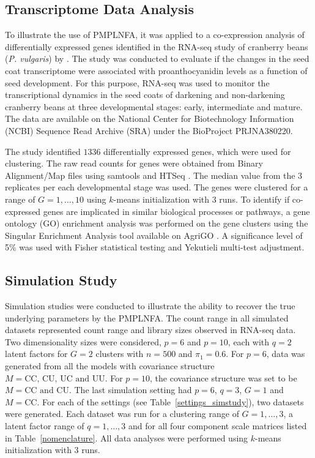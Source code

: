 \documentclass[12pt]{article}
\begin{document}
\subsection{Transcriptome Data Analysis} 
To illustrate the use of PMPLNFA, it was applied to a co-expression analysis of differentially expressed genes identified in the RNA-seq study of cranberry beans (\textit{P. vulgaris}) by \citet{freixascoutin2017}. The study was conducted to evaluate if the changes in the seed coat transcriptome were associated with proanthocyanidin levels as a function of seed development. For this purpose, RNA-seq was used to monitor the transcriptional dynamics in the seed coats of darkening and non-darkening cranberry beans at three developmental stages: early, intermediate and mature. The data are available on the National Center for Biotechnology Information (NCBI) Sequence Read Archive (SRA) under the BioProject PRJNA380220.

The study identified $1336$ differentially expressed genes, which were used for clustering. The raw read counts for genes were obtained from Binary Alignment/Map files using samtools \citep{li2009} and HTSeq \citep{anders2015}. The median value from the $3$ replicates per each developmental stage was used. The genes were clustered for a range of $G = 1, \ldots , 10$ using $k$-means initialization with $3$ runs. To identify if co-expressed genes are implicated in similar biological processes or pathways, a gene ontology (GO) enrichment analysis was performed on the gene clusters using the Singular Enrichment Analysis tool available on AgriGO \citep{du2010}. A significance level of 5\% was used with Fisher statistical testing and Yekutieli multi-test adjustment.

\subsection{Simulation Study}
Simulation studies were conducted to illustrate the ability to recover the true underlying parameters by the PMPLNFA. The count range in all simulated datasets represented count range and library sizes observed in RNA-seq data. Two dimensionality sizes were considered, $p = 6$ and $p = 10$, each with $q = 2$ latent factors for $G = 2$ clusters with $n =  500$ and $\pi_1 = 0.6$. For $p = 6$, data was generated from all the models with covariance structure $ M = \text{CC, CU, UC and UU}$. For $p = 10$, the covariance structure was set to be $M = \text{CC and CU}$. The last simulation setting had $p = 6$, $q = 3$, $G = 1$ and  $M = \text{CC}$. For each of the settings (see Table~\ref{settings_simstudy}), two datasets were generated. Each dataset was run for a clustering range of $G = 1,\ldots, 3$, a latent factor range of $q = 1,\ldots, 3$ and for all four component scale matrices listed in Table~\ref{nomenclature}. All data analyses were performed using $k$-means initialization with $3$ runs.
\end{document}
